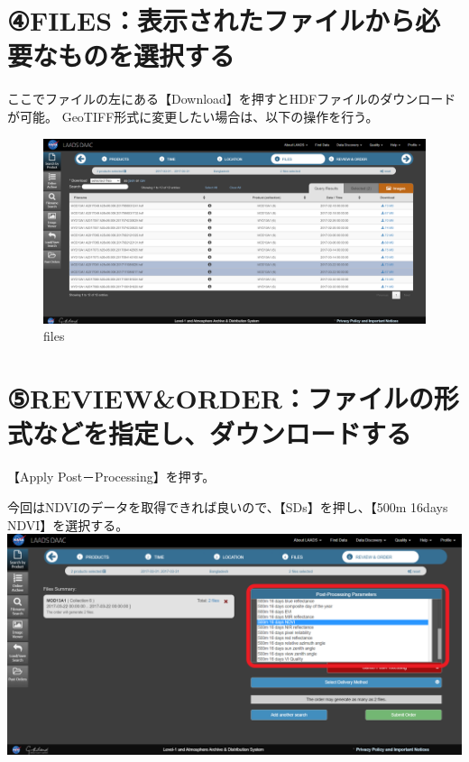 \documentclass[
]{book}
\begin{document}
\hypertarget{filesux8868ux793aux3055ux308cux305fux30d5ux30a1ux30a4ux30ebux304bux3089ux5fc5ux8981ux306aux3082ux306eux3092ux9078ux629eux3059ux308b}{%
\section{④FILES：表示されたファイルから必要なものを選択する}\label{filesux8868ux793aux3055ux308cux305fux30d5ux30a1ux30a4ux30ebux304bux3089ux5fc5ux8981ux306aux3082ux306eux3092ux9078ux629eux3059ux308b}}

ここでファイルの左にある【Download】を押すとHDFファイルのダウンロードが可能。
GeoTIFF形式に変更したい場合は、以下の操作を行う。

\begin{figure}
\centering
\includegraphics{images/LD-5.png}
\caption{files}
\end{figure}

\hypertarget{revieworderux30d5ux30a1ux30a4ux30ebux306eux5f62ux5f0fux306aux3069ux3092ux6307ux5b9aux3057ux30c0ux30a6ux30f3ux30edux30fcux30c9ux3059ux308b}{%
\section{⑤REVIEW\&ORDER：ファイルの形式などを指定し、ダウンロードする}\label{revieworderux30d5ux30a1ux30a4ux30ebux306eux5f62ux5f0fux306aux3069ux3092ux6307ux5b9aux3057ux30c0ux30a6ux30f3ux30edux30fcux30c9ux3059ux308b}}

【Apply Post－Processing】を押す。

今回はNDVIのデータを取得できれば良いので、【SDs】を押し、【500m 16days NDVI】を選択する。
\includegraphics{images/LD-6.png}
\end{document}
